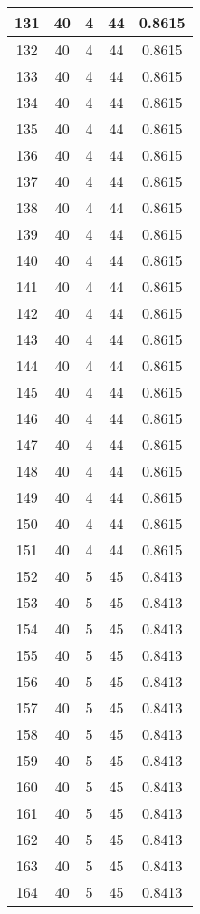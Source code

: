 \documentclass[letterpaper, 12pt]{article}
\begin{document}
\begin{longtable}{|c|c|c|c|c|}
\hline
131 & 40 & 4 & 44 & 0.8615 \\
\hline
132 & 40 & 4 & 44 & 0.8615 \\
\hline
133 & 40 & 4 & 44 & 0.8615 \\
\hline
134 & 40 & 4 & 44 & 0.8615 \\
\hline
135 & 40 & 4 & 44 & 0.8615 \\
\hline
136 & 40 & 4 & 44 & 0.8615 \\
\hline
137 & 40 & 4 & 44 & 0.8615 \\
\hline
138 & 40 & 4 & 44 & 0.8615 \\
\hline
139 & 40 & 4 & 44 & 0.8615 \\
\hline
140 & 40 & 4 & 44 & 0.8615 \\
\hline
141 & 40 & 4 & 44 & 0.8615 \\
\hline
142 & 40 & 4 & 44 & 0.8615 \\
\hline
143 & 40 & 4 & 44 & 0.8615 \\
\hline
144 & 40 & 4 & 44 & 0.8615 \\
\hline
145 & 40 & 4 & 44 & 0.8615 \\
\hline
146 & 40 & 4 & 44 & 0.8615 \\
\hline
147 & 40 & 4 & 44 & 0.8615 \\
\hline
148 & 40 & 4 & 44 & 0.8615 \\
\hline
149 & 40 & 4 & 44 & 0.8615 \\
\hline
150 & 40 & 4 & 44 & 0.8615 \\
\hline
151 & 40 & 4 & 44 & 0.8615 \\
\hline
152 & 40 & 5 & 45 & 0.8413 \\
\hline
153 & 40 & 5 & 45 & 0.8413 \\
\hline
154 & 40 & 5 & 45 & 0.8413 \\
\hline
155 & 40 & 5 & 45 & 0.8413 \\
\hline
156 & 40 & 5 & 45 & 0.8413 \\
\hline
157 & 40 & 5 & 45 & 0.8413 \\
\hline
158 & 40 & 5 & 45 & 0.8413 \\
\hline
159 & 40 & 5 & 45 & 0.8413 \\
\hline
160 & 40 & 5 & 45 & 0.8413 \\
\hline
161 & 40 & 5 & 45 & 0.8413 \\
\hline
162 & 40 & 5 & 45 & 0.8413 \\
\hline
163 & 40 & 5 & 45 & 0.8413 \\
\hline
164 & 40 & 5 & 45 & 0.8413 \\

\end{longtable}
\end{document}

